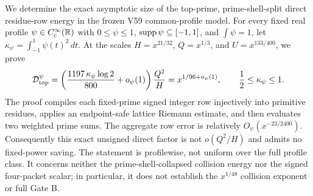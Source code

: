 We determine the exact asymptotic size of the top-prime, prime-shell-split
direct residue-row energy in the frozen V59 common-profile model.  For every
fixed real profile $\psi\in C_c^\infty(\mathbb{R})$ with
$0\leq\psi\leq1$, $\operatorname{supp}\psi\subseteq[-1,1]$, and
$\int\psi=1$, let $\kappa_\psi=\int_{-1}^{1}\psi(t)^2\,dt$.
At the scales
$H=x^{21/32}$, $Q=x^{1/3}$, and $U=x^{133/400}$, we prove
\[
 \mathcal{D}_{\mathrm{top}}^{\psi}=\left(\frac{1197\,\kappa_\psi\log2}{800}
       +o_\psi(1)\right)\frac{Q^2}{H}
       =x^{1/96+o_\psi(1)},
 \qquad \frac12\leq\kappa_\psi\leq1.
\]
The proof compiles each fixed-prime signed integer row injectively into
primitive residues, applies an endpoint-safe lattice Riemann estimate, and
then evaluates two weighted prime sums.  The aggregate row error is relatively
$O_\psi(x^{-23/2400})$.  Consequently this exact unsigned direct factor is not
$o(Q^2/H)$ and admits no fixed-power saving.  The statement is profilewise,
not uniform over the full profile class.  It concerns neither the
prime-shell-collapsed collision energy nor the signed four-packet scalar; in
particular, it does not establish the $x^{1/48}$ collision exponent or full
Gate B.
